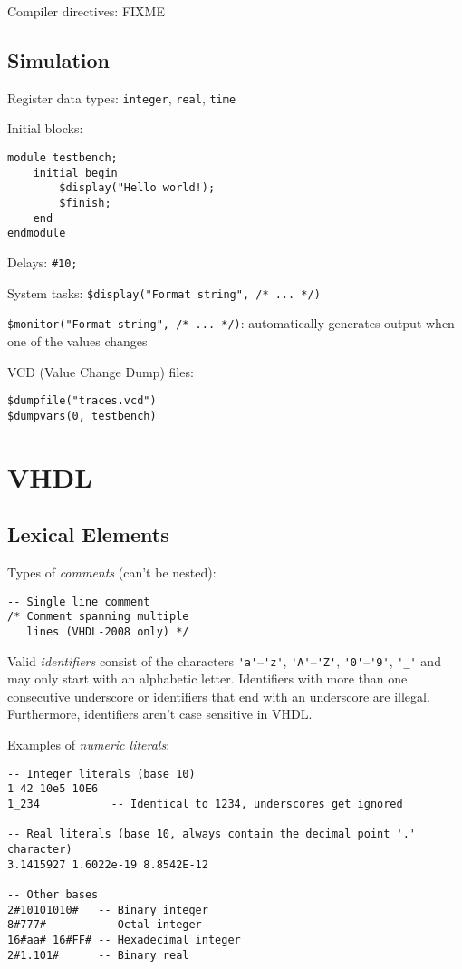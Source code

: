 \documentclass[fontsize=11pt,a4paper]{scrartcl}
\begin{document}
Compiler directives: FIXME
%
%
%
%
\subsection{Simulation}
Register data types: \lstinline!integer!, \lstinline!real!, \lstinline!time!

Initial blocks:
\begin{lstlisting}
module testbench;
	initial begin
		$display("Hello world!);
		$finish;
	end
endmodule
\end{lstlisting}

Delays: \lstinline!#10;!

System tasks: \lstinline!$display("Format string", /* ... */)!

\lstinline!$monitor("Format string", /* ... */)!: automatically generates output when one of the values changes

VCD (Value Change Dump) files:
\begin{lstlisting}
$dumpfile("traces.vcd")
$dumpvars(0, testbench)
\end{lstlisting}
%
%
%
%
%
\section{VHDL}
\subsection{Lexical Elements}
Types of \emph{comments} (can't be nested):
\begin{lstlisting}
-- Single line comment
/* Comment spanning multiple
   lines (VHDL-2008 only) */
\end{lstlisting}

Valid \emph{identifiers} consist of the characters \lstinline!'a'!--\lstinline!'z'!, \lstinline!'A'!--\lstinline!'Z'!, \lstinline!'0'!--\lstinline!'9'!, \lstinline!'_'! and may only start with an alphabetic letter. Identifiers with more than one consecutive underscore or identifiers that end with an underscore are illegal. Furthermore, identifiers aren't case sensitive in VHDL.

Examples of \emph{numeric literals}:
\begin{lstlisting}
-- Integer literals (base 10)
1 42 10e5 10E6
1_234           -- Identical to 1234, underscores get ignored

-- Real literals (base 10, always contain the decimal point '.' character)
3.1415927 1.6022e-19 8.8542E-12

-- Other bases
2#10101010#   -- Binary integer
8#777#        -- Octal integer
16#aa# 16#FF# -- Hexadecimal integer
2#1.101#      -- Binary real
\end{lstlisting}
\end{document}
